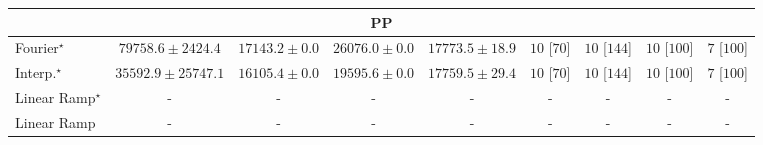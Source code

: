 \begin{tabular}{l|cccc|cccc|}
\cline{1-9}
\multicolumn{9}{c}{\rule{0pt}{8pt}PP} \\
\midrule
Fourier$^\star$ & {\cellcolor[HTML]{004529}} \color[HTML]{F1F1F1} $79758.6\pm 2424.4$ & {\cellcolor[HTML]{FBFED2}} \color[HTML]{000000} $17143.2\pm 0.0$ & {\cellcolor[HTML]{E7F6AD}} \color[HTML]{000000} $26076.0\pm 0.0$ & {\cellcolor[HTML]{FBFDCE}} \color[HTML]{000000} $17773.5\pm 18.9$ & {\cellcolor[HTML]{49006A}} \color[HTML]{F1F1F1} $10$ [$70$] & {\cellcolor[HTML]{49006A}} \color[HTML]{F1F1F1} $10$ [$144$] & {\cellcolor[HTML]{49006A}} \color[HTML]{F1F1F1} $10$ [$100$] & {\cellcolor[HTML]{CD238F}} \color[HTML]{F1F1F1} $7$ [$100$] \\
Interp.$^\star$ & {\cellcolor[HTML]{BCE395}} \color[HTML]{000000} $35592.9\pm 25747.1$ & {\cellcolor[HTML]{FCFED7}} \color[HTML]{000000} $16105.4\pm 0.0$ & {\cellcolor[HTML]{F9FDC4}} \color[HTML]{000000} $19595.6\pm 0.0$ & {\cellcolor[HTML]{FBFDCE}} \color[HTML]{000000} $17759.5\pm 29.4$ & {\cellcolor[HTML]{49006A}} \color[HTML]{F1F1F1} $10$ [$70$] & {\cellcolor[HTML]{49006A}} \color[HTML]{F1F1F1} $10$ [$144$] & {\cellcolor[HTML]{49006A}} \color[HTML]{F1F1F1} $10$ [$100$] & {\cellcolor[HTML]{CD238F}} \color[HTML]{F1F1F1} $7$ [$100$] \\
Linear Ramp$^\star$ & {\cellcolor[HTML]{000000}} \color[HTML]{F1F1F1} {\cellcolor{white}} \color{black} - & {\cellcolor[HTML]{000000}} \color[HTML]{F1F1F1} {\cellcolor{white}} \color{black} - & {\cellcolor[HTML]{000000}} \color[HTML]{F1F1F1} {\cellcolor{white}} \color{black} - & {\cellcolor[HTML]{000000}} \color[HTML]{F1F1F1} {\cellcolor{white}} \color{black} - & {\cellcolor[HTML]{000000}} \color[HTML]{F1F1F1} {\cellcolor{white}} \color{black} - & {\cellcolor[HTML]{000000}} \color[HTML]{F1F1F1} {\cellcolor{white}} \color{black} - & {\cellcolor[HTML]{000000}} \color[HTML]{F1F1F1} {\cellcolor{white}} \color{black} - & {\cellcolor[HTML]{000000}} \color[HTML]{F1F1F1} {\cellcolor{white}} \color{black} - \\
Linear Ramp & {\cellcolor[HTML]{000000}} \color[HTML]{F1F1F1} {\cellcolor{white}} \color{black} - & {\cellcolor[HTML]{000000}} \color[HTML]{F1F1F1} {\cellcolor{white}} \color{black} - & {\cellcolor[HTML]{000000}} \color[HTML]{F1F1F1} {\cellcolor{white}} \color{black} - & {\cellcolor[HTML]{000000}} \color[HTML]{F1F1F1} {\cellcolor{white}} \color{black} - & {\cellcolor[HTML]{000000}} \color[HTML]{F1F1F1} {\cellcolor{white}} \color{black} - & {\cellcolor[HTML]{000000}} \color[HTML]{F1F1F1} {\cellcolor{white}} \color{black} - & {\cellcolor[HTML]{000000}} \color[HTML]{F1F1F1} {\cellcolor{white}} \color{black} - & {\cellcolor[HTML]{000000}} \color[HTML]{F1F1F1} {\cellcolor{white}} \color{black} - \\

\end{tabular}
